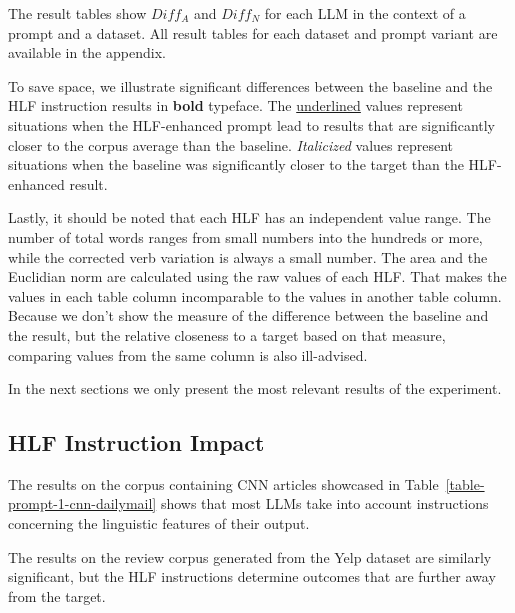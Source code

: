 \documentclass[11pt]{article}
\begin{document}
The result tables show $Diff_A$ and $Diff_N$ for each LLM in the context of a
prompt and a dataset.
All result tables for each dataset and prompt variant are available in the
appendix.

To save space, we illustrate significant differences between the baseline and
the HLF instruction results in \textbf{bold} typeface.
The \underline{underlined} values represent situations when the HLF-enhanced
prompt lead to results that are significantly closer to the corpus average than
the baseline.
\textit{Italicized} values represent situations when the baseline was
significantly closer to the target than the HLF-enhanced result.

Lastly, it should be noted that each HLF has an independent value range.
The number of total words ranges from small numbers into the hundreds or more,
while the corrected verb variation is always a small number.
The area and the Euclidian norm are calculated using the raw values of each HLF.
That makes the values in each table column incomparable to the values in another
table column.
Because we don't show the measure of the difference between the baseline and the
result, but the relative closeness to a target based on that measure, comparing
values from the same column is also ill-advised.

In the next sections we only present the most relevant results of the
experiment.

\subsection{HLF Instruction Impact}

The results on the corpus containing CNN articles showcased in
Table~\ref{table-prompt-1-cnn-dailymail} shows that most LLMs take into account
instructions concerning the linguistic features of their output.

The results on the review corpus generated from the Yelp dataset are similarly
significant, but the HLF instructions determine outcomes that are further away
from the target.
\end{document}
